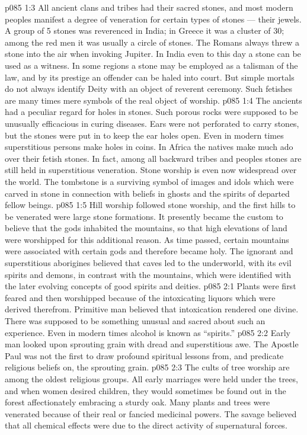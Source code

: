 \vs p085 1:3 All ancient clans and tribes had their sacred stones, and most modern peoples manifest a degree of veneration for certain types of stones --- their jewels. A group of 5 stones was reverenced in India; in Greece it was a cluster of 30; among the red men it was usually a circle of stones. The Romans always threw a stone into the air when invoking Jupiter. In India even to this day a stone can be used as a witness. In some regions a stone may be employed as a talisman of the law, and by its prestige an offender can be haled into court. But simple mortals do not always identify Deity with an object of reverent ceremony. Such fetishes are many times mere symbols of the real object of worship.
\vs p085 1:4 The ancients had a peculiar regard for holes in stones. Such porous rocks were supposed to be unusually efficacious in curing diseases. Ears were not perforated to carry stones, but the stones were put in to keep the ear holes open. Even in modern times superstitious persons make holes in coins. In Africa the natives make much ado over their fetish stones. In fact, among all backward tribes and peoples stones are still held in superstitious veneration. Stone worship is even now widespread over the world. The tombstone is a surviving symbol of images and idols which were carved in stone in connection with beliefs in ghosts and the spirits of departed fellow beings.
\vs p085 1:5 Hill worship followed stone worship, and the first hills to be venerated were large stone formations. It presently became the custom to believe that the gods inhabited the mountains, so that high elevations of land were worshipped for this additional reason. As time passed, certain mountains were associated with certain gods and therefore became holy. The ignorant and superstitious aborigines believed that caves led to the underworld, with its evil spirits and demons, in contrast with the mountains, which were identified with the later evolving concepts of good spirits and deities.
\vs p085 2:1 Plants were first feared and then worshipped because of the intoxicating liquors which were derived therefrom. Primitive man believed that intoxication rendered one divine. There was supposed to be something unusual and sacred about such an experience. Even in modern times alcohol is known as “spirits.”
\vs p085 2:2 Early man looked upon sprouting grain with dread and superstitious awe. The Apostle Paul was not the first to draw profound spiritual lessons from, and predicate religious beliefs on, the sprouting grain.
\vs p085 2:3 The cults of tree worship are among the oldest religious groups. All early marriages were held under the trees, and when women desired children, they would sometimes be found out in the forest affectionately embracing a sturdy oak. Many plants and trees were venerated because of their real or fancied medicinal powers. The savage believed that all chemical effects were due to the direct activity of supernatural forces.
